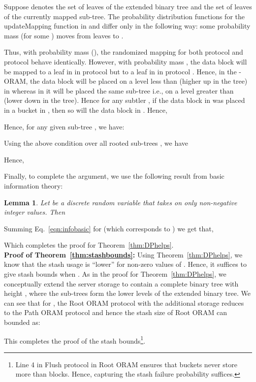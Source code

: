 \documentclass[USenglish,oneside,twocolumn]{article}
\newtheorem{lemma}{Lemma}
\newcommand{\ourprotocol}{Root ORAM}
\begin{document}
Suppose  denotes the set of leaves of the extended binary tree and  the set of leaves of the currently mapped sub-tree. The probability distribution functions for the updateMapping function in  and  differ only in the following way: some probability mass  (for some ) moves from leaves  to .

Thus, with probability mass (), the randomized mapping for both protocol  and protocol  behave identically. However, with probability mass , the data block will be mapped to a leaf in  in protocol  but to a leaf in  in protocol . Hence, in the -ORAM, the data block will be placed on a level less than  (higher up in the tree) in  whereas in  it will be placed the same sub-tree i.e., on a level greater than  (lower down in the tree). Hence for any subtler , if the data block in  was placed in a bucket in , then so will the data block in . Hence,


Hence, for any given sub-tree , we have:

Using the above condition over all rooted sub-trees , we have

Hence, 

Finally, to complete the argument, we use the following result from basic information theory:
\begin{lemma}
Let  be a discrete random variable that takes on only non-negative integer values. Then

\end{lemma}
Summing Eq.~\ref{eqn:infobasic} for  (which corresponds to ) we get that,

Which completes the proof for Theorem~\ref{thm:DPhelps}. \\

\textbf{Proof of Theorem~\ref{thm:stashbounds}: }Using Theorem~\ref{thm:DPhelps}, we know that the stash usage is ``lower'' for non-zero values of . Hence, it suffices to give stash bounds when . As in the proof for Theorem~\ref{thm:DPhelps}, we conceptually extend the server storage to contain a complete binary tree with height , where the sub-trees form the lower levels of the extended binary tree. We can see that for , the \ourprotocol{} protocol with the additional storage reduces to the Path ORAM protocol and hence the stash size of \ourprotocol{} can bounded as: 



This completes the proof of the stash bounds\footnote{Line 4 in Flush protocol in \ourprotocol{} ensures that buckets never store more than  blocks. Hence, capturing the stash failure probability suffices.}. \\
\end{document}
